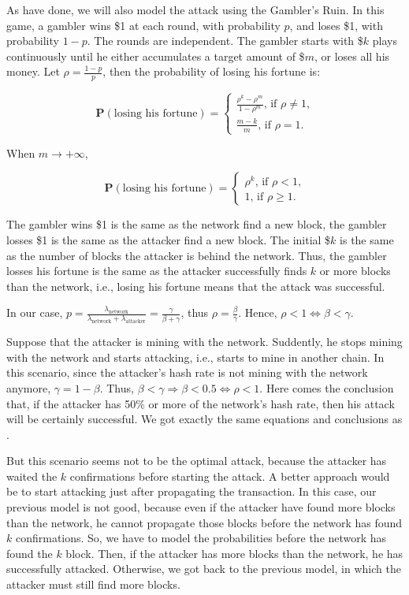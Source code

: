 As \cite{nakamoto2008bitcoin} have done, we will also model the attack using the Gambler's Ruin. In this game, a gambler wins \$1 at each round, with probability $p$, and loses \$1, with probability $1-p$. The rounds are independent. The gambler starts with \$$k$ plays continuously until he either accumulates a target amount of \$$m$, or loses all his money. Let $\rho = \frac{1-p}{p}$, then the probability of losing his fortune is:

$$
\mathbf{P}(\text{losing his fortune}) =
\begin{cases}
	\frac{\rho^k - \rho^m}{1-\rho^m} \text{, if $\rho \ne 1$,} \\
	\frac{m-k}{m} \text{, if $\rho = 1$.}
\end{cases}
$$

When $m \rightarrow +\infty$,

$$
\mathbf{P}(\text{losing his fortune}) =
\begin{cases}
	\rho^k \text{, if $\rho < 1$,} \\
	1 \text{, if $\rho \geq 1$.}
\end{cases}
$$


The gambler wins \$1 is the same as the network find a new block, the gambler losses \$1 is the same as the attacker find a new block. The initial \$$k$ is the same as the number of blocks the attacker is behind the network. Thus, the gambler losses his fortune is the same as the attacker successfully finds $k$ or more blocks than the network, i.e., losing his fortune means that the attack was successful.

In our case, $p = \frac{\lambda_{\text{network}}}{\lambda_{\text{network}} + \lambda_{\text{attacker}}} = \frac{\gamma}{\beta + \gamma}$, thus $\rho = \frac{\beta}{\gamma}$. Hence, $\rho < 1 \Leftrightarrow \beta < \gamma$.

Suppose that the attacker is mining with the network. Suddently, he stops mining with the network and starts attacking, i.e., starts to mine in another chain. In this scenario, since the attacker's hash rate is not mining with the network anymore, $\gamma = 1 - \beta$. Thus, $\beta < \gamma \Rightarrow \beta < 0.5 \Leftrightarrow \rho < 1$. Here comes the conclusion that, if the attacker has 50\% or more of the network's hash rate, then his attack will be certainly successful. We got exactly the same equations and conclusions as \cite{nakamoto2008bitcoin}.

But this scenario seems not to be the optimal attack, because the attacker has waited the $k$ confirmations before starting the attack. A better approach would be to start attacking just after propagating the transaction. In this case, our previous model is not good, because even if the attacker have found more blocks than the network, he cannot propagate those blocks before the network has found $k$ confirmations. So, we have to model the probabilities before the network has found the $k$ block. Then, if the attacker has more blocks than the network, he has successfully attacked. Otherwise, we got back to the previous model, in which the attacker must still find more blocks.

